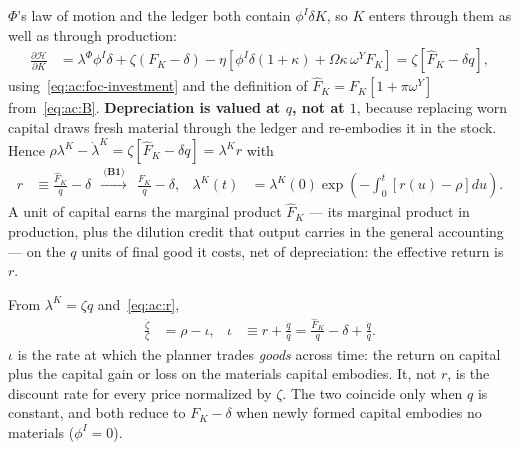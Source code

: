  $\Phi$'s law of motion and the ledger both contain $\phi^I\delta K$, so $K$ enters through them as well as through production:
\begin{align}
\frac{\partial\mathcal H}{\partial K} &= \lambda^\Phi\phi^I\delta+\zeta\left(F_K-\delta\right)-\eta\left[\phi^I\delta\left(1+\kappa\right)+\Omega\kappa\,\omega^YF_K\right]
= \zeta\left[\widehat F_K-\delta q\right],
\label{eq:ac:H-K}
\end{align}
using~\eqref{eq:ac:foc-investment} and the definition of $\widehat F_K=F_K\left[1+\pi\omega^Y\right]$ from~\eqref{eq:ac:B}. \textbf{Depreciation is valued at $q$, not at $1$}, because replacing worn capital draws fresh material through the ledger and re-embodies it in the stock. Hence $\rho\lambda^K-\dot\lambda^K=\zeta\left[\widehat F_K-\delta q\right]=\lambda^Kr$ with
\begin{align}
r &\equiv \frac{\widehat F_K}{q}-\delta
\ \ \xrightarrow{\ \textbf{(B1)}\ }\ \ \frac{F_K}{q}-\delta,
&
\lambda^K(t) &= \lambda^K(0)\exp\left(-\int_0^t\left[r(u)-\rho\right]du\right).
\label{eq:ac:r}
\end{align}
A unit of capital earns the marginal product $\widehat F_K$ --- its marginal product in production, plus the dilution credit that output carries in the general accounting --- on the $q$ units of final good it costs, net of depreciation: the effective return is $r$.

 From $\lambda^K=\zeta q$ and~\eqref{eq:ac:r},
\begin{align}
\frac{\dot\zeta}{\zeta} &= \rho-\iota,
&
\iota &\equiv r+\frac{\dot q}{q}=\frac{\widehat F_K}{q}-\delta+\frac{\dot q}{q}.
\label{eq:ac:iota}
\end{align}
$\iota$ is the rate at which the planner trades \emph{goods} across time: the return on capital plus the capital gain or loss on the materials capital embodies. It, not $r$, is the discount rate for every price normalized by $\zeta$. The two coincide only when $q$ is constant, and both reduce to $F_K-\delta$ when newly formed capital embodies no materials ($\phi^I=0$).

